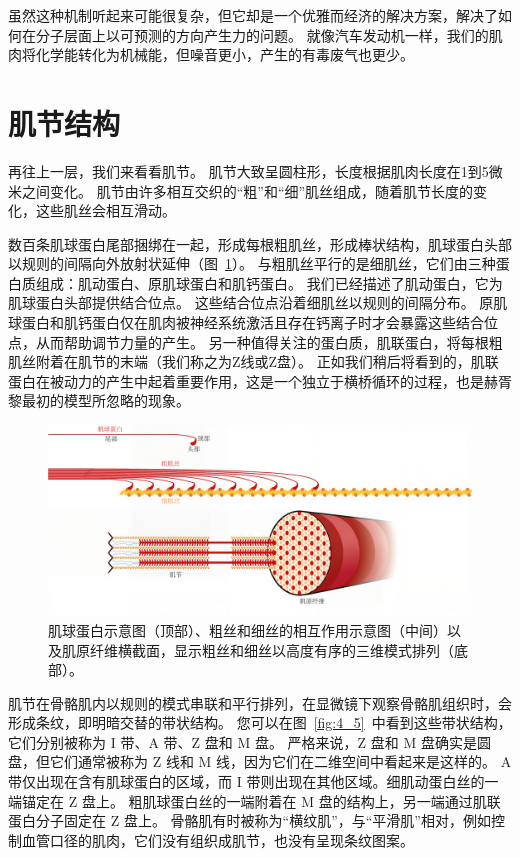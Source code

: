 虽然这种机制听起来可能很复杂，但它却是一个优雅而经济的解决方案，解决了如何在分子层面上以可预测的方向产生力的问题。
就像汽车发动机一样，我们的肌肉将化学能转化为机械能，但噪音更小，产生的有毒废气也更少。


\section{肌节结构}

再往上一层，我们来看看肌节。
肌节大致呈圆柱形，长度根据肌肉长度在1到5微米之间变化。
肌节由许多相互交织的“粗”和“细”肌丝组成，随着肌节长度的变化，这些肌丝会相互滑动。


数百条肌球蛋白尾部捆绑在一起，形成每根粗肌丝，形成棒状结构，肌球蛋白头部以规则的间隔向外放射状延伸（图~\ref{fig:4_4}）。
与粗肌丝平行的是细肌丝，它们由三种蛋白质组成：肌动蛋白、原肌球蛋白和肌钙蛋白。
我们已经描述了肌动蛋白，它为肌球蛋白头部提供结合位点。
这些结合位点沿着细肌丝以规则的间隔分布。
原肌球蛋白和肌钙蛋白仅在肌肉被神经系统激活且存在钙离子时才会暴露这些结合位点，从而帮助调节力量的产生。
另一种值得关注的蛋白质，肌联蛋白，将每根粗肌丝附着在肌节的末端（我们称之为Z线或Z盘）。
正如我们稍后将看到的，肌联蛋白在被动力的产生中起着重要作用，这是一个独立于横桥循环的过程，也是赫胥黎最初的模型所忽略的现象。

\begin{figure}[!htb]
	\centering
	\includegraphics[width=1.0\linewidth]{chap4/4_4}
	\caption{肌球蛋白示意图（顶部）、粗丝和细丝的相互作用示意图（中间）以及肌原纤维横截面，显示粗丝和细丝以高度有序的三维模式排列（底部）。 \label{fig:4_4}}
\end{figure}

肌节在骨骼肌内以规则的模式串联和平行排列，在显微镜下观察骨骼肌组织时，会形成条纹，即明暗交替的带状结构。
您可以在图~\ref{fig:4_5}~中看到这些带状结构，它们分别被称为 I 带、A 带、Z 盘和 M 盘。
严格来说，Z 盘和 M 盘确实是圆盘，但它们通常被称为 Z 线和 M 线，因为它们在二维空间中看起来是这样的。
A 带仅出现在含有肌球蛋白的区域，而 I 带则出现在其他区域。细肌动蛋白丝的一端锚定在 Z 盘上。
粗肌球蛋白丝的一端附着在 M 盘的结构上，另一端通过肌联蛋白分子固定在 Z 盘上。
骨骼肌有时被称为“横纹肌”，与“平滑肌”相对，例如控制血管口径的肌肉，它们没有组织成肌节，也没有呈现条纹图案。

